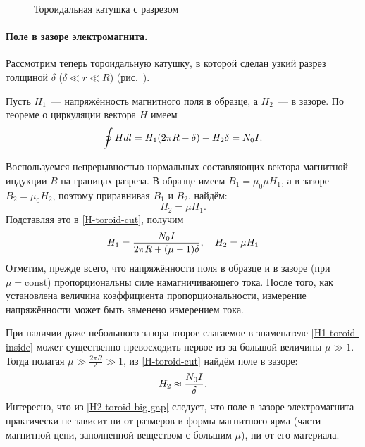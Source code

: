 \begin{wrapfigure}{r}{0.4\textwidth}
    \caption{Тороидальная катушка с разрезом}
\end{wrapfigure}

\paragraph{Поле в зазоре электромагнита.}
Рассмотрим теперь тороидальную катушку, в которой сделан узкий разрез толщиной
$\delta$ ($\delta \ll r \ll R$) (рис.~).

Пусть $H_1$~--- напряжённость магнитного поля в
образце, а $H_2$~--- в зазоре. По теореме о циркуляции вектора $H$ имеем
\begin{equation}
	\eqmark{H-toroid-cut}
	\oint {Hdl} = H_1 (2\pi R - \delta) + H_2 \delta  = N_0 I.
\end{equation}

Воспользуемся нeпрерывностью нормальных составляющих вектора магнитной
индукции $B$ на границах разреза. В образце имеем $B_1 = \mu_0 \mu H_1$,
а в зазоре $B_2 = \mu_0 H_2$, поэтому приравнивая $B_1$ и $B_2$, найдём:
\[H_2 = \mu H_1.\]
Подставляя это в \eqref{H-toroid-cut}, получим
\begin{equation}
	\eqmark{H1-toroid-inside}
	H_1 = \frac{N_0 I}{2\pi R + (\mu - 1)\delta},\quad H_2 = \mu H_1
\end{equation}
Отметим, прежде всего, что напряжённости поля в образце и в зазоре
(при $\mu = \mathrm{const}$) пропорциональны силе намагничивающего тока.
После того, как установлена величина коэффициента
пропорциональности, измерение напряжённости может быть заменено измерением тока.

При наличии даже небольшого зазора второе слагаемое в знаменателе
\eqref{H1-toroid-inside} может существенно превосходить первое из-за большой величины
$\mu\gg1$. Тогда полагая $\mu\gg \frac{2\pi R}{\delta}\gg 1$, из
\eqref{H-toroid-cut} найдём поле в зазоре:
\begin{equation}
	\eqmark{H2-toroid-big gap}
	H_2 \approx \frac{N_0 I}{\delta}.
\end{equation}
Интересно, что из \eqref{H2-toroid-big gap} следует, что поле в зазоре
электромагнита практически не зависит ни от размеров и формы магнитного ярма (части
магнитной цепи, заполненной веществом с большим $\mu$), ни от его материала.



